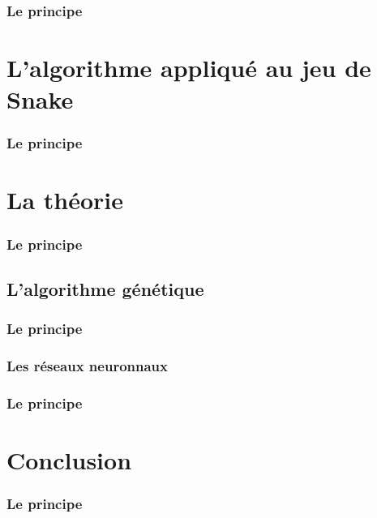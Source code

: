 \documentclass[10pt]{beamer}
\begin{document}
\begin{frame}
  \frametitle{Le principe}
  \end{frame}

\section{L'algorithme appliqué au jeu de Snake}

\begin{frame}
  \frametitle{Le principe}
  \end{frame}

\section{La théorie}

\begin{frame}
  \frametitle{Le principe}
  \end{frame}

\subsection{L'algorithme génétique}

\begin{frame}
  \frametitle{Le principe}
  \end{frame}

\subsubsection{Les réseaux neuronnaux}

\begin{frame}
  \frametitle{Le principe}
  \end{frame}

\section{Conclusion}

\begin{frame}
  \frametitle{Le principe}
  \end{frame}
\end{document}
